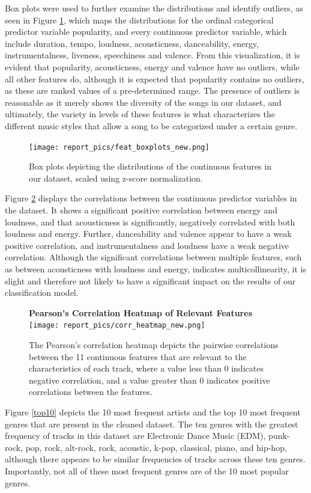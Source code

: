 \documentclass[times, twocolumn]{article}
\begin{document}
Box plots were used to further examine the distributions and identify outliers, as seen in Figure \ref{Boxplots}, which maps the distributions for the ordinal categorical predictor variable popularity, and every continuous predictor variable, which include duration, tempo, loudness, acousticness, danceability, energy, instrumentalness, liveness, speechiness and valence. From this visualization, it is evident that popularity, acousticness, energy and valence have no outliers, while all other features do, although it is expected that popularity contains no outliers, as these are ranked values of a pre-determined range. The presence of outliers is reasonable as it merely shows the diversity of the songs in our dataset, and ultimately, the variety in levels of these features is what characterizes the different music styles that allow a song to be categorized under a certain genre.
\begin{figure}[H]
    \centering
    \texttt{[image: report\_pics/feat\_boxplots\_new.png]}
    \caption{Box plots depicting the distributions of the continuous features in our dataset, scaled using z-score normalization.}
    \label{Boxplots}
\end{figure}
Figure \ref{heatmap} displays the correlations between the continuous predictor variables in the dataset. It shows a significant positive correlation between energy and loudness, and that acousticness is significantly, negatively correlated with both loudness and energy. Further, danceability and valence appear to have a weak positive correlation, and instrumentalness and loudness have a weak negative correlation. Although the significant correlations between multiple features, such as between acousticness with loudness and energy, indicates multicollinearity, it is slight and therefore not likely to have a significant impact on the results of our classification model.
\begin{figure}[H]
    \centering
    \textbf{Pearson's Correlation Heatmap of Relevant Features}
    \texttt{[image: report\_pics/corr\_heatmap\_new.png]}
    \caption{The Pearson's correlation heatmap depicts the pairwise correlations between the 11  continuous features that are relevant to the characteristics of each track, where a value less than 0 indicates negative correlation, and a value greater than 0 indicates positive correlations between the features.}
    \label{heatmap}
\end{figure}

Figure \ref{top10} depicts the 10 most frequent artists and the top 10 most frequent genres that are present in the cleaned dataset. The ten genres with the greatest frequency of tracks in this dataset are Electronic Dance Music (EDM), punk-rock, pop, rock, alt-rock, rock, acoustic, k-pop, classical, piano, and hip-hop, although there appears to be similar frequencies of tracks across these ten genres. Importantly, not all of these most frequent genres are of the 10 most popular genres.
\end{document}
